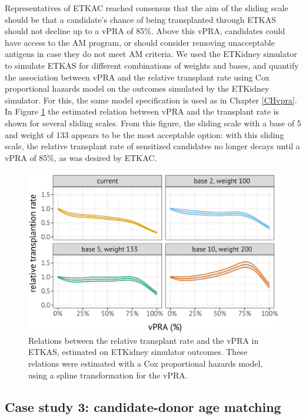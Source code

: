 \documentclass[11pt,twoside,]{book}
\begin{document}
Representatives of ETKAC reached consensus that the aim of the
sliding scale should be that a candidate's chance of being transplanted
through ETKAS should not decline up to a vPRA of 85\%. Above this vPRA,
candidates could have access to the AM program, or should consider removing unacceptable antigens in case they do not
meet AM criteria. We used the ETKidney simulator to simulate ETKAS for
different combinations of weights and bases,
and quantify the association between vPRA and the relative
transplant rate using Cox proportional hazards model on the outcomes simulated
by the ETKidney simulator. For this, the same model specification is used as in Chapter
\ref{CHvpra}. In Figure
\ref{fig:ch8fig4} the estimated relation between vPRA and the transplant rate is
shown for several sliding scales. From this figure, the sliding scale
with a base of 5 and weight of 133 appears to be the most acceptable
option: with this sliding scale, the relative transplant rate
of sensitized candidates no longer decays until a vPRA of 85\%, as was desired
by ETKAC.

\begin{figure}[ht]

{\centering \includegraphics[width=0.85\linewidth]{figures/ch8//fig4-vpra_effect} 

}

\caption{Relations between the relative transplant rate and the vPRA in ETKAS, estimated on ETKidney simulator outcomes. These relations were estimated with a Cox proportional hazards model, using a spline transformation for the vPRA.}\label{fig:ch8fig4}
\end{figure}

\FloatBarrier

\subsection{Case study 3: candidate-donor age matching}\label{sec:etkidneycasestudyagematching}
\end{document}
